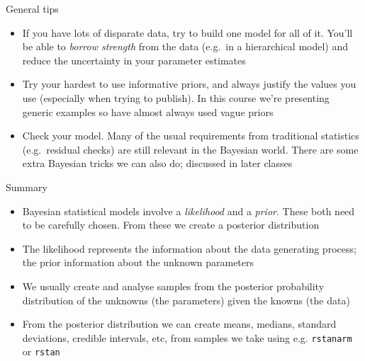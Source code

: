 \documentclass[ignorenonframetext,]{beamer}
\begin{document}
\begin{frame}{General tips}

\begin{itemize}
\item
  If you have lots of disparate data, try to build one model for all of
  it. You'll be able to \emph{borrow strength} from the data (e.g.~in a
  hierarchical model) and reduce the uncertainty in your parameter
  estimates
\item
  Try your hardest to use informative priors, and always justify the
  values you use (especially when trying to publish). In this course
  we're presenting generic examples so have almost always used vague
  priors
\item
  Check your model. Many of the usual requirements from traditional
  statistics (e.g.~residual checks) are still relevant in the Bayesian
  world. There are some extra Bayesian tricks we can also do; discussed
  in later classes
\end{itemize}

\end{frame}

\begin{frame}[fragile]{Summary}

\begin{itemize}
\item
  Bayesian statistical models involve a \emph{likelihood} and a
  \emph{prior}. These both need to be carefully chosen. From these we
  create a posterior distribution
\item
  The likelihood represents the information about the data generating
  process; the prior information about the unknown parameters
\item
  We usually create and analyse samples from the posterior probability
  distribution of the unknowns (the parameters) given the knowns (the
  data)
\item
  From the posterior distribution we can create means, medians, standard
  deviations, credible intervals, etc, from samples we take using e.g.
  \texttt{rstanarm} or \texttt{rstan}
\end{itemize}

\end{frame}
\end{document}
